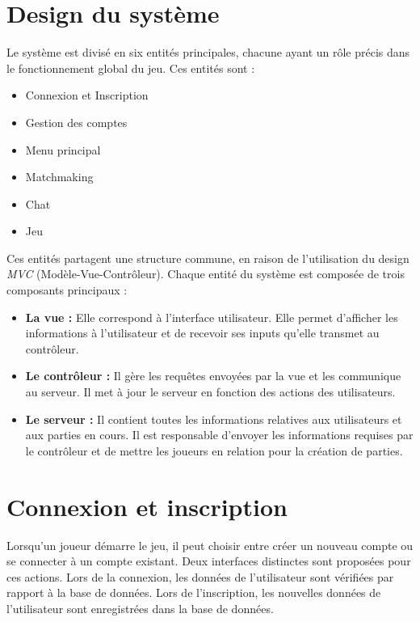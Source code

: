 \documentclass{report}
\begin{document}
\section*{Design du système}

\noindent Le système est divisé en six entités principales, chacune ayant un rôle précis dans le fonctionnement global du jeu. Ces entités sont :  
\begin{itemize}
    \item Connexion et Inscription
    \item Gestion des comptes
    \item Menu principal
    \item Matchmaking
    \item Chat
    \item Jeu
\end{itemize}

\noindent Ces entités partagent une structure commune, en raison de l'utilisation du design \emph{MVC} (Modèle-Vue-Contrôleur). Chaque entité du système est composée de trois composants principaux :  
\begin{itemize}
    \item \textbf{La vue :} Elle correspond à l'interface utilisateur. Elle permet d'afficher les informations à l'utilisateur et de recevoir ses inputs qu'elle transmet au contrôleur.  
    \item \textbf{Le contrôleur :} Il gère les requêtes envoyées par la vue et les communique au serveur. Il met à jour le serveur en fonction des actions des utilisateurs.  
    \item \textbf{Le serveur :} Il contient toutes les informations relatives aux utilisateurs et aux parties en cours. Il est responsable d'envoyer les informations requises par le contrôleur et de mettre les joueurs en relation pour la création de parties.
\end{itemize}

\section{Connexion et inscription}

\noindent Lorsqu'un joueur démarre le jeu, il peut choisir entre créer un nouveau compte ou se connecter à un compte existant. Deux interfaces distinctes sont proposées pour ces actions. Lors de la connexion, les données de l'utilisateur sont vérifiées par rapport à la base de données. Lors de l'inscription, les nouvelles données de l'utilisateur sont enregistrées dans la base de données.
\end{document}
